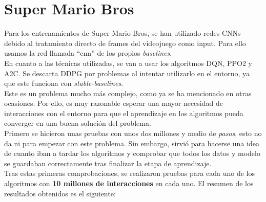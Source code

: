 \documentclass[11pt,fleqn]{book} %
\begin{document}
\section{Super Mario Bros}\label{expmario}

Para los entrenamientos de Super Mario Bros, se han utilizado redes CNNs debido al tratamiento directo de frames del videojuego como input. Para ello usamos la red llamada ``cnn'' de los propios \textit{baselines}. \cite{article:redesbaselines} \\

En cuanto a las técnicas utilizadas, se van a usar los algoritmos DQN, PPO2 y A2C. Se descarta DDPG por problemas al intentar utilizarlo en el entorno, ya que este funciona con \textit{stable-baselines}. \\

Este es un problema mucho más complejo, como ya se ha mencionado en otras ocasiones. Por ello, es muy razonable esperar una mayor necesidad de interacciones con el entorno para que el aprendizaje en los algoritmos pueda converger en una buena solución del problema. \\

Primero se hicieron unas pruebas con unos dos millones y medio de \textit{pasos}, esto no da ni para empezar con este problema. Sin embargo, sirvió para hacerse una idea de cuanto iban a tardar los algoritmos y comprobar que todos los datos y modelo se guardaban correctamente tras finalizar la etapa de aprendizaje. \\

Tras estas primeras comprobaciones, se realizaron pruebas para cada uno de los algoritmos con \textbf{10 millones de interacciones} en cada uno. El resumen de los resultados obtenidos es el siguiente:
\end{document}
